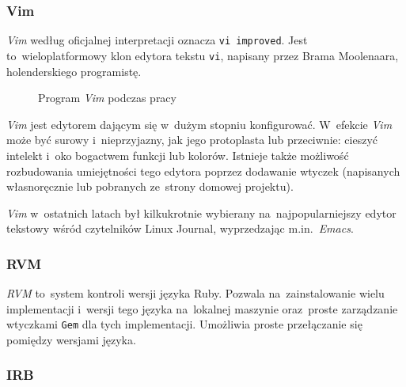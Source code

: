 \subsubsection{Vim}

\textit{Vim} \cite{vim} według oficjalnej interpretacji oznacza \texttt{vi improved}. Jest to~wieloplatformowy klon edytora tekstu \texttt{vi}, napisany przez Brama Moolenaara, holenderskiego programistę.

\begin{figure}[ht]
\centering
{}
\caption{Program \textit{Vim} podczas pracy}
\end{figure}

\textit{Vim} jest edytorem dającym się w~dużym stopniu konfigurować. W~efekcie \textit{Vim} może być surowy i~nieprzyjazny, jak jego protoplasta lub przeciwnie: cieszyć intelekt i~oko bogactwem funkcji lub kolorów. Istnieje także możliwość rozbudowania umiejętności tego edytora poprzez dodawanie wtyczek (napisanych własnoręcznie lub pobranych ze~strony domowej projektu).


\textit{Vim} w~ostatnich latach był kilkukrotnie wybierany na~najpopularniejszy edytor tekstowy wśród czytelników Linux Journal, wyprzedzając m.in.~\textit{Emacs}.

\subsubsection{RVM}

\textit{RVM} \cite{rvm} to~system kontroli wersji języka Ruby. Pozwala na~zainstalowanie wielu implementacji i~wersji tego języka na~lokalnej maszynie oraz~proste zarządzanie wtyczkami \texttt{Gem} dla tych implementacji. Umożliwia proste przełączanie się pomiędzy wersjami języka.

\subsubsection{IRB}


